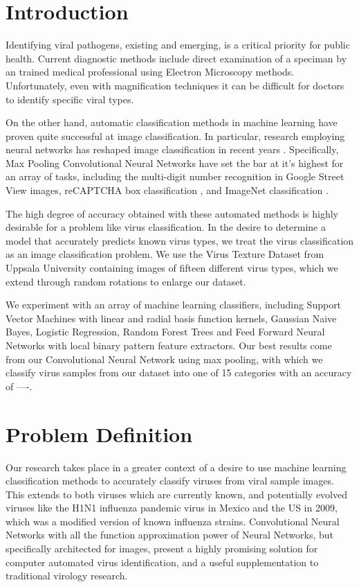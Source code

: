 \begin{multicols}{2}
\section{Introduction}
Identifying viral pathogens, existing and emerging, is a critical priority for public health. Current diagnostic methods include direct examination of a speciman by an trained medical professional using Electron Microscopy methods. Unfortunately, even with magnification techniques it can be difficult for doctors to identify specific viral types. 

On the other hand, automatic classification methods in machine learning have proven quite successful at image classification. In particular, research employing neural networks has reshaped image classification in recent years \citet{Juergen_2015}. Specifically, Max Pooling Convolutional Neural Networks have set the bar at it's highest for an array of tasks, including the multi-digit number recognition in Google Street View images, reCAPTCHA box classification \citet{DBLP:journals/corr/GoodfellowBIAS13}, and ImageNet classification \citet{NIPS2012_4824}. 

The high degree of accuracy obtained with these automated methods is highly desirable for a problem like virus classification. In the desire to determine a model that accurately predicts known virus types, we treat the virus classification as an image classification problem. We use the Virus Texture Dataset from Uppsala University containing images of fifteen different virus types, which we extend through random rotations to enlarge our dataset. 

We experiment with an array of machine learning classifiers, including Support Vector Machines with linear and radial basis function kernels, Gaussian Naive Bayes, Logistic Regression, Random Forest Trees and Feed Forward Neural Networks with local binary pattern feature extractors. Our best results come from our Convolutional Neural Network using max pooling, with which we classify virus samples from our dataset into one of 15 categories with an accuracy of ----. 


\section{Problem Definition}

Our research takes place in a greater context of a desire to use machine learning classification methods to accurately classify viruses from viral sample images. This extends to both viruses which are currently known, and potentially evolved viruses like the H1N1 influenza pandemic virus in Mexico and the US in 2009,  which was a modified version of known influenza strains. Convolutional Neural Networks with all the function approximation power of Neural Networks, but specifically architected for images, present a highly promising solution for computer automated virus identification, and a useful supplementation to traditional virology research. 


\end{multicols}

